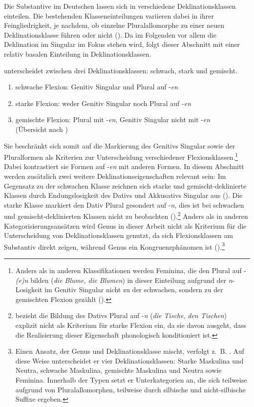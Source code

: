 Die Substantive im Deutschen lassen sich in verschiedene Deklinationsklassen einteilen. Die bestehenden Klasseneinteilungen variieren dabei in ihrer Feingliedrigkeit, je nachdem, ob einzelne Pluralallomorphe zu einer neuen Deklinationsklasse führen oder nicht (\cite[57]{Krischke.2012}). Da im Folgenden vor allem die Deklination im Singular im Fokus stehen wird, folgt dieser Abschnitt mit \textcite{Nubling.2008} einer relativ basalen Einteilung in Deklinationsklassen. 


\begin{sloppypar}
\textcite[283]{Nubling.2008} unterscheidet zwischen drei Deklinationsklassen: schwach, stark und gemischt. 
\end{sloppypar}

\begin{enumerate}
\item schwache Flexion: Genitiv Singular und Plural auf -\textit{en}
\item starke Flexion: weder Genitiv Singular noch Plural auf -\textit{en}  
\item gemischte Flexion: Plural mit -\textit{en}, Genitiv Singular nicht mit -\textit{en}  \\
(Übersicht nach \cite[283]{Nubling.2008})
\end{enumerate}

Sie beschränkt sich somit auf die Markierung des Genitivs Singular sowie der Pluralformen als Kriterien zur Unterscheidung verschiedener Flexionsklassen.\footnote{Anders als in anderen Klassifikationen werden Feminina, die den Plural auf -\textit{(e)n} bilden (\textit{die Blume, die Blumen}) in dieser Einteilung aufgrund der \textit{n}-Losigkeit im Genitiv Singular nicht zu der schwachen, sondern zu der gemischten Flexion gezählt (\cite[164]{Nubling.2016}).} Dabei kontrastiert sie Formen auf -\textit{en} mit anderen Formen. In diesem Abschnitt werden zusätzlich zwei weitere Deklinationseigenschaften relevant sein: Im Gegensatz zu der schwachen Klasse zeichnen sich starke und gemischt-deklinierte Klassen durch Endungslosigkeit des Dativs und Akkusativs Singular aus (\cite[153--155]{Eisenberg.2013}). Die starke Klasse markiert den Dativ Plural gesondert auf -\textit{n}, dies ist bei schwachen und gemischt-deklinierten Klassen nicht zu beobachten (\cite[153--155]{Eisenberg.2013}).\footnote{\textcite[283]{Nubling.2008} bezieht die Bildung des Dativs Plural auf -\textit{n} (\textit{die Tische}, \textit{den Tischen}) explizit nicht als Kriterium für starke Flexion ein, da sie davon ausgeht, dass die Realisierung dieser Eigenschaft phonologisch konditioniert ist.} Anders als in anderen Kategorisierungsansätzen wird Genus in dieser Arbeit nicht als Kriterium für die Unterscheidung von Deklinationsklassen genutzt, da sich Flexionsklassen am Substantiv direkt zeigen, während Genus ein Kongruenzphänomen ist (\cite[283]{Nubling.2008}).\footnote{Einen Ansatz, der Genus und Deklinationsklasse mischt, verfolgt z.~B. \textcite[152--156]{Eisenberg.2013}. Auf diese Weise unterscheidet er vier Deklinationsklassen: Starke Maskulina und Neutra, schwache Maskulina, gemischte Maskulina und Neutra sowie Feminina. Innerhalb der Typen setzt er Unterkategorien an, die sich teilweise aufgrund von Pluralallomorphen, teilweise durch silbische und nicht-silbische Suffixe ergeben.}

